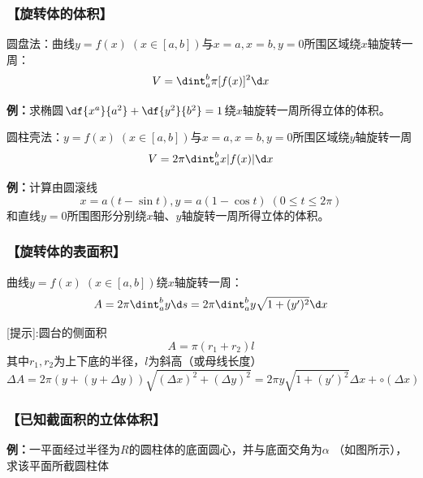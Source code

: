 \subsubsection{【旋转体的体积】}

圆盘法：曲线$y=f(x)\;(x\in[a,b])$与$x=a,x=b,y=0$所围区域绕$x$轴旋转一周：
$$V=\dint_a^b\pi[f(x)]^2\d x$$

{\bf 例：}求椭圆$\df{x^a}{a^2}+\df{y^2}{b^2}=1$绕$x$轴旋转一周所得立体的体积。

圆柱壳法：$y=f(x)\;(x\in[a,b])$与$x=a,x=b,y=0$所围区域绕$y$轴旋转一周
$$V=2\pi\dint_a^bx|f(x)|\d x$$

{\bf 例：}计算由圆滚线$$x=a(t-\sin t),y=a(1-\cos t)\;(0\leq t\leq 2\pi)$$
和直线$y=0$所围图形分别绕$x$轴、$y$轴旋转一周所得立体的体积。

\subsubsection{【旋转体的表面积】}
曲线$y=f(x)\;(x\in[a,b])$绕$x$轴旋转一周：
$$A=2\pi \dint_a^by\d s=2\pi \dint_a^by\sqrt{1+(y')^2}\d x$$

[提示]:圆台的侧面积
$$A=\pi(r_1+r_2)l$$
其中$r_1,r_2$为上下底的半径，$l$为斜高（或母线长度）
$$\Delta A=2\pi(y+(y+\Delta y))\sqrt{(\Delta x)^2+(\Delta y)^2}
=2\pi y\sqrt{1+(y')^2}\Delta x+\circ(\Delta x)$$

\subsubsection{【已知截面积的立体体积】}

{\bf 例：}一平面经过半径为$R$的圆柱体的底面圆心，并与底面交角为$\alpha$
（如图所示），求该平面所截圆柱体

\begin{center}
\end{center}

